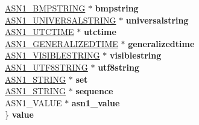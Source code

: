 \begin{DoxyCompactItemize}
\begin{tabbing}
\>\hyperlink{structasn1__string__st}{ASN1\_BMPSTRING} $\ast$ {\bfseries bmpstring}\\
\>\hyperlink{structasn1__string__st}{ASN1\_UNIVERSALSTRING} $\ast$ {\bfseries universalstring}\\
\>\hyperlink{structasn1__string__st}{ASN1\_UTCTIME} $\ast$ {\bfseries utctime}\\
\>\hyperlink{structasn1__string__st}{ASN1\_GENERALIZEDTIME} $\ast$ {\bfseries generalizedtime}\\
\>\hyperlink{structasn1__string__st}{ASN1\_VISIBLESTRING} $\ast$ {\bfseries visiblestring}\\
\>\hyperlink{structasn1__string__st}{ASN1\_UTF8STRING} $\ast$ {\bfseries utf8string}\\
\>\hyperlink{structasn1__string__st}{ASN1\_STRING} $\ast$ {\bfseries set}\\
\>\hyperlink{structasn1__string__st}{ASN1\_STRING} $\ast$ {\bfseries sequence}\\
\>ASN1\_VALUE $\ast$ {\bfseries asn1\_value}\\
\} {\bfseries value}\\


\end{tabbing}
\end{DoxyCompactItemize}
